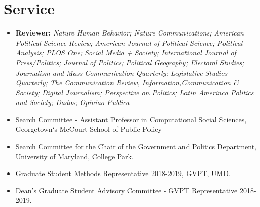 \documentclass[letterpaper, 11pt]{article}
\begin{document}






\section*{Service}

    \begin{itemize}[leftmargin=.45cm]
    \item \textbf{Reviewer:} \textit{Nature Human Behavior; Nature Communications; American Political Science Review; American Journal of Political Science; Political Analysis; PLOS One; Social Media + Society; International Journal of Press/Politics; Journal of Politics; Political Geography; Electoral Studies; Journalism and Mass Communication Quarterly; Legislative Studies Quarterly; The Communication Review, Information,Communication \& Society; Digital Journalism; Perspective on Politics; Latin Amerinca Politics and Society; Dados; Opiniao Publica}
    \end{itemize}


    \begin{itemize}[leftmargin=.45cm]

            \item Search Committee - Assistant Professor in Computational Social Sciences, Georgetown`s McCourt School of  Public Policy
            \item Search Committee for the Chair of the Government and Politics Department, University of Maryland, College Park.
        \item Graduate Student Methods Representative 2018-2019, GVPT, UMD.
        \item Dean's Graduate Student Advisory Committee - GVPT Representative 2018-2019.
    \end{itemize}
\end{document}
